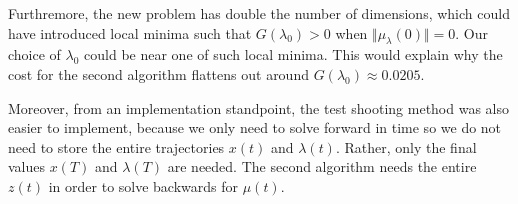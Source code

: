 \documentclass[letterpaper,11pt,titlepage]{article}
\begin{document}
\begin{enumerate}[leftmargin=0pt]
\begin{enumerate}
    Furthremore, the new problem has double the number of dimensions, which could have introduced local minima such that $G(\lambda_0)>0$ when $\Vert\mu_\lambda(0)\Vert=0$. Our choice of $\lambda_0$ could be near one of such local minima. This would explain why the cost for the second algorithm flattens out around $G(\lambda_0)\approx 0.0205$.

    Moreover, from an implementation standpoint, the test shooting method was also easier to implement, because we only need to solve forward in time so we do not need to store the entire trajectories $x(t)$ and $\lambda(t)$. Rather, only the final values $x(T)$ and $\lambda(T)$ are needed. The second algorithm needs the entire $z(t)$ in order to solve backwards for $\mu(t)$.

    
  \end{enumerate}


\end{enumerate}
\end{document}

